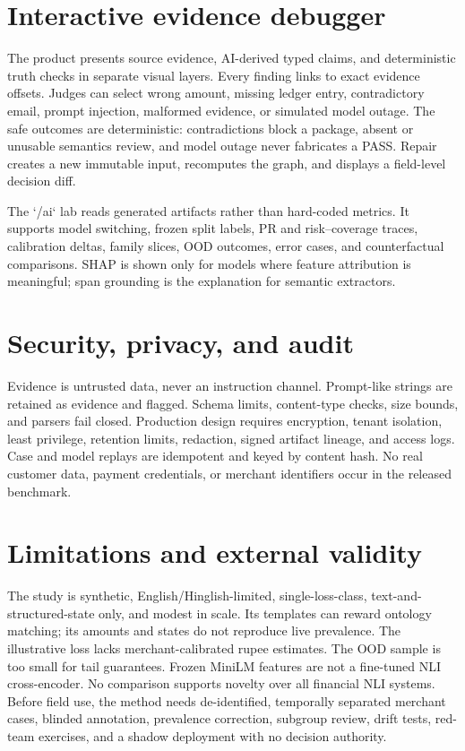 \documentclass[10pt,twocolumn]{article}
\begin{document}
\section{Interactive evidence debugger}
The product presents source evidence, AI-derived typed claims, and deterministic truth checks in separate visual layers. Every finding links to exact evidence offsets. Judges can select wrong amount, missing ledger entry, contradictory email, prompt injection, malformed evidence, or simulated model outage. The safe outcomes are deterministic: contradictions block a package, absent or unusable semantics review, and model outage never fabricates a PASS. Repair creates a new immutable input, recomputes the graph, and displays a field-level decision diff.

The `/ai` lab reads generated artifacts rather than hard-coded metrics. It supports model switching, frozen split labels, PR and risk--coverage traces, calibration deltas, family slices, OOD outcomes, error cases, and counterfactual comparisons. SHAP is shown only for models where feature attribution is meaningful; span grounding is the explanation for semantic extractors.

\section{Security, privacy, and audit}
Evidence is untrusted data, never an instruction channel. Prompt-like strings are retained as evidence and flagged. Schema limits, content-type checks, size bounds, and parsers fail closed. Production design requires encryption, tenant isolation, least privilege, retention limits, redaction, signed artifact lineage, and access logs. Case and model replays are idempotent and keyed by content hash. No real customer data, payment credentials, or merchant identifiers occur in the released benchmark.

\section{Limitations and external validity}
The study is synthetic, English/Hinglish-limited, single-loss-class, text-and-structured-state only, and modest in scale. Its templates can reward ontology matching; its amounts and states do not reproduce live prevalence. The illustrative loss lacks merchant-calibrated rupee estimates. The OOD sample is too small for tail guarantees. Frozen MiniLM features are not a fine-tuned NLI cross-encoder. No comparison supports novelty over all financial NLI systems. Before field use, the method needs de-identified, temporally separated merchant cases, blinded annotation, prevalence correction, subgroup review, drift tests, red-team exercises, and a shadow deployment with no decision authority.
\end{document}
